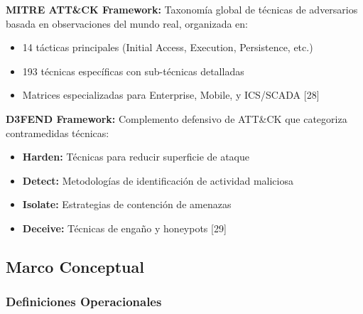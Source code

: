 \textbf{MITRE ATT\&CK Framework:}
Taxonomía global de técnicas de adversarios basada en observaciones del mundo real, organizada en:
\begin{itemize}
    \item 14 tácticas principales (Initial Access, Execution, Persistence, etc.)
    \item 193 técnicas específicas con sub-técnicas detalladas
    \item Matrices especializadas para Enterprise, Mobile, y ICS/SCADA [28]
\end{itemize}

\textbf{D3FEND Framework:}
Complemento defensivo de ATT\&CK que categoriza contramedidas técnicas:
\begin{itemize}
    \item \textbf{Harden:} Técnicas para reducir superficie de ataque
    \item \textbf{Detect:} Metodologías de identificación de actividad maliciosa
    \item \textbf{Isolate:} Estrategias de contención de amenazas
    \item \textbf{Deceive:} Técnicas de engaño y honeypots [29]
\end{itemize}

\subsection{Marco Conceptual}

\subsubsection{Definiciones Operacionales}

